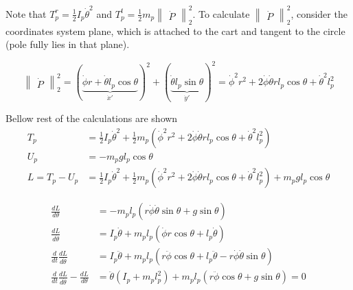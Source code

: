 \documentclass[12pt]{article}
\begin{document}
Note that $T_p^r = \frac{1}{2}I_p\dot{\theta}^2$ and $T_p^t = \frac{1}{2}m_p \begin{Vmatrix} \dot{P} \end{Vmatrix}_2^2$.
To calculate $\begin{Vmatrix} \dot{P} \end{Vmatrix}_2^2$, consider the coordinates system plane, which is attached to the cart and tangent to the circle (pole fully lies in that plane).

\begin{center}
    \begin{adjustbox}{width=0.5\textwidth}
        
    \end{adjustbox}
\end{center}

\begin{equation}
    \begin{Vmatrix} \dot{P} \end{Vmatrix}_2^2 = \left(\underbrace{\dot{\phi} r + \dot{\theta} l_p \cos \theta }_{\dot{x}'}\right)^2 + \left(\underbrace{\dot{\theta} l_p \sin \theta}_{\dot{y}'} \right)^2 = \dot{\phi}^2 r^2 + 2 \dot{\phi} \dot{\theta} r l_p \cos \theta + \dot{\theta}^2 l_p^2
\end{equation}

Bellow rest of the calculations are shown
\begin{align*}
    T_p &= \frac{1}{2}I_p\dot{\theta}^2 + \frac{1}{2}m_p\left(\dot{\phi}^2 r^2 + 2 \dot{\phi} \dot{\theta} r l_p \cos \theta + \dot{\theta}^2 l_p^2\right) \\
    U_p &= - m_p g l_p \cos \theta \\
    L = T_p - U_p &= \frac{1}{2} I_p \dot{\theta}^2 + \frac{1}{2} m_p \left(\dot{\phi}^2 r^2 + 2 \dot{\phi} \dot{\theta} r l_p \cos \theta + \dot{\theta}^2 l_p^2\right) + m_p g l_p \cos \theta
\end{align*}

\begin{align*}
    \frac{dL}{d\theta}                                         & = - m_p l_p (r \dot{\phi} \dot{\theta} \sin \theta + g \sin \theta) \nonumber \\
    \frac{dL}{d\dot{\theta}}                                   & = I_p \dot{\theta} + m_p l_p (\dot{\phi} r \cos \theta + l_p \dot{\theta}) \nonumber \\
    \frac{d}{dt} \frac{dL}{d\dot{\theta}}                      & = I_p \ddot{\theta} + m_p l_p (r \ddot{\phi} \cos \theta + l_p \ddot{\theta} - r \dot{\phi} \dot{\theta} \sin \theta) \nonumber \\
    \frac{d}{dt} \frac{dL}{d\dot{\theta}} - \frac{dL}{d\theta} & = \ddot{\theta} (I_p  + m_p l_p^2) + m_p l_p (r \ddot{\phi} \cos \theta + g \sin \theta) = 0
\end{align*}
\end{document}
